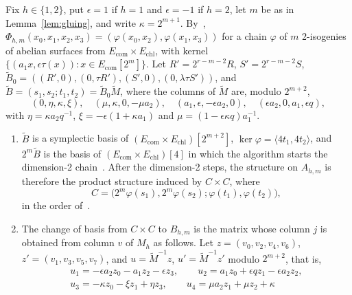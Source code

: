 \documentclass[version=preprint]{iacrcc}
\newcommand{\Ecom}{E_{\mathrm{com}}}
\newcommand{\Echl}{E_{\mathrm{chl}}}
\begin{document}
    \begin{proposition}
        \label{prop:gluingbasis}
        Fix $h \in \{1, 2\}$, put $\epsilon = 1$ if $h = 1$ and $\epsilon = -1$ if
        $h = 2$, let $m$ be as in Lemma~\ref{lem:gluing}, and write $\kappa = 2^{m+1}$.
        By~\cite[Lemmas 23 and 28]{Dar24}, $\Phi_{h,m}(x_0, x_1, x_2, x_3) =
        (\varphi(x_0, x_2), \varphi(x_1, x_3))$ for a chain $\varphi$ of $m$
        2-isogenies of abelian surfaces from $\Ecom \times \Echl$, with kernel
        $\{(a_1 x, \epsilon\tau(x)) : x \in \Ecom[2^m]\}$. Let $R' = 2^{r-m-2} R$,
        $S' = 2^{r-m-2} S$, $\tilde B_0 = ((R', 0), (0, \tau R'), (S', 0), (0,
        \lambda\tau S'))$, and $\tilde B = (s_1, s_2; t_1, t_2) = \tilde B_0 \tilde
        M$, where the columns of $\tilde M$ are, modulo $2^{m+2}$,
        \[
        (0, \eta, \kappa, \xi), \quad (\mu, \kappa, 0, -\mu a_2), \quad (a_1, \epsilon,
        -\epsilon a_2, 0), \quad (\epsilon a_2, 0, a_1, \epsilon q),
        \]
        with $\eta = \kappa a_2 q^{-1}$, $\xi = -\epsilon(1 + \kappa a_1)$ and $\mu = (1 -
        \epsilon \kappa q) a_1^{-1}$.
        \begin{enumerate}[label=(\roman*)]
            \item $\tilde B$ is a symplectic basis of $(\Ecom \times
            \Echl)[2^{m+2}]$, $\ker \varphi = \langle 4 t_1, 4 t_2 \rangle$, and $2^m
            \tilde B$ is the basis of $(\Ecom \times \Echl)[4]$ in which the
            algorithm starts the dimension-2 chain~\cite[Lemmas 24 and 25, Appendix
            C.1]{Dar24}. After the dimension-2 steps, the structure on $A_{h,m}$ is
            therefore the product structure induced by $C \times C$, where
            \[
            C = \bigl(2^m \varphi(s_1), 2^m \varphi(s_2); \varphi(t_1), \varphi(t_2)\bigr),
            \]
            in the order of~\cite[Appendix C.2.2]{Dar24}.
            \item The change of basis from $C \times C$ to $B_{h,m}$ is the matrix
            whose column $j$ is obtained from column $v$ of $M_h$ as follows. Let $z
            = (v_0, v_2, v_4, v_6)$, $z' = (v_1, v_3, v_5, v_7)$, and $u = \tilde
            M^{-1} z$, $u' = \tilde M^{-1} z'$ modulo $2^{m+2}$, that is,
            \begin{gather*}
                u_1 = -\epsilon a_2 z_0 - a_1 z_2 - \epsilon z_3, \qquad u_2 = a_1 z_0
                + \epsilon q z_1 - \epsilon a_2 z_2, \\
                u_3 = -\kappa z_0 - \xi z_1 + \eta z_3, \qquad u_4 = \mu a_2 z_1 + \mu z_2 + \kappa

\end{gather*}
\end{enumerate}
\end{proposition}
\end{document}
